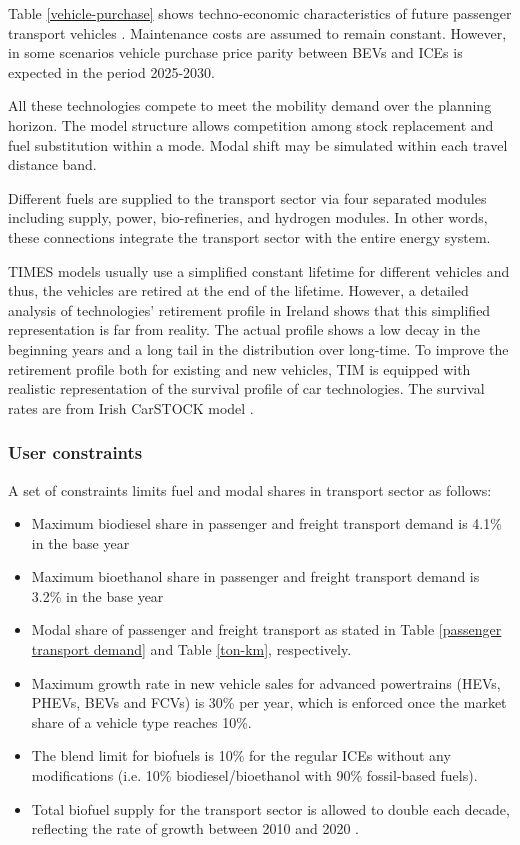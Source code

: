 \documentclass[journal abbreviation, manuscript]{copernicus}
\begin{document}
Table \ref{vehicle-purchase} shows techno-economic characteristics of future passenger transport vehicles \citep{Mulholland2017,Helgeson2020}. Maintenance costs are assumed to remain constant. However, in some scenarios vehicle purchase price parity between BEVs and ICEs is expected in the period 2025-2030. 

All these technologies compete to meet the mobility demand over the planning horizon. The model structure allows competition among stock replacement and fuel substitution within a mode. Modal shift may be simulated within each travel distance band. 

Different fuels are supplied to the transport sector via four separated modules including supply, power, bio-refineries, and hydrogen modules. In other words, these connections integrate the transport sector with the entire energy system.

TIMES models usually use a simplified constant lifetime for different vehicles and thus, the vehicles are retired at the end of the lifetime. However, a detailed analysis of technologies’ retirement profile in Ireland shows that this simplified representation is far from reality. The actual profile shows a low decay in the beginning years and a long tail in the distribution over long-time. To improve the retirement profile both for existing and new vehicles, TIM is equipped with realistic representation of the survival profile of car technologies. The survival rates are from Irish CarSTOCK model \citep{daly2011modelling, Mulholland2018}. 

\subsubsection{User constraints}

A set of constraints limits fuel and modal shares in transport sector as follows: 
\begin{itemize}
 \item Maximum biodiesel share in passenger and freight transport demand is 4.1\% in the base year
 \item Maximum bioethanol share in passenger and freight transport demand is 3.2\% in the base year
 \item Modal share of passenger and freight transport as stated in Table \ref{passenger transport demand} and Table \ref{ton-km}, respectively. 
 \item Maximum growth rate in new vehicle sales for advanced powertrains (HEVs, PHEVs, BEVs and FCVs) is 30\% per year, which is enforced once the market share of a vehicle type reaches 10\%.
 \item The blend limit for biofuels is 10\% for the regular ICEs without any modifications (i.e. 10\% biodiesel/bioethanol with 90\% fossil-based fuels). 
 \item Total biofuel supply for the transport sector is allowed to double each decade, reflecting the rate of growth between 2010 and 2020 \citep{NORA2019}. 
\end{itemize}
\end{document}
